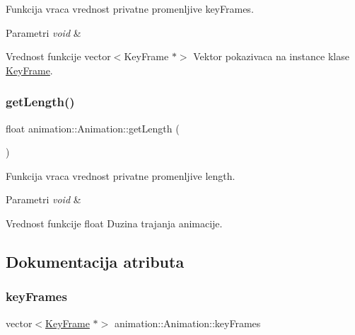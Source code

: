 Funkcija vraca vrednost privatne promenljive key\+Frames. 


\begin{DoxyParams}{Parametri}
{\em void} & \\
\hline
\end{DoxyParams}
\begin{DoxyReturn}{Vrednost funkcije}
vector$<$\+Key\+Frame $\ast$$>$ Vektor pokazivaca na instance klase \hyperlink{classanimation_1_1KeyFrame}{Key\+Frame}. 
\end{DoxyReturn}
\mbox{\label{classanimation_1_1Animation_a8af39eddf1bec211e7b7252a770a2d4c}} 
\subsubsection{\texorpdfstring{get\+Length()}{getLength()}}
{\footnotesize\ttfamily float animation\+::\+Animation\+::get\+Length (\begin{DoxyParamCaption}{ }\end{DoxyParamCaption})}



Funkcija vraca vrednost privatne promenljive length. 


\begin{DoxyParams}{Parametri}
{\em void} & \\
\hline
\end{DoxyParams}
\begin{DoxyReturn}{Vrednost funkcije}
float Duzina trajanja animacije. 
\end{DoxyReturn}


\subsection{Dokumentacija atributa}
\mbox{\label{classanimation_1_1Animation_a371ea96eed842fd75e5c36cc757c232d}} 
\subsubsection{\texorpdfstring{key\+Frames}{keyFrames}}
{\footnotesize\ttfamily vector$<$\hyperlink{classanimation_1_1KeyFrame}{Key\+Frame} $\ast$$>$ animation\+::\+Animation\+::key\+Frames\hspace{0.3cm}{\ttfamily [private]}}



